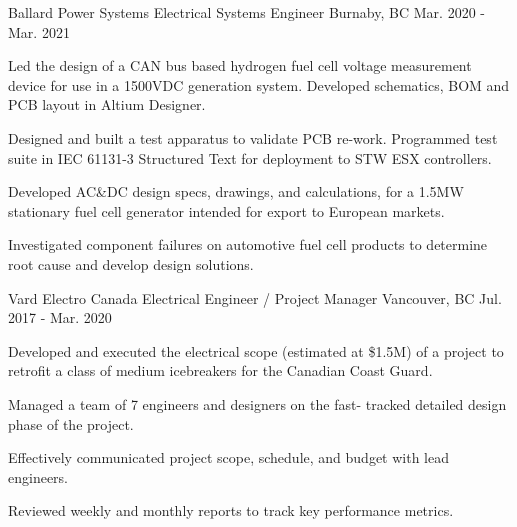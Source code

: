 \begin{cventries}
    \cventry
    {Ballard Power Systems} %
    {Electrical Systems Engineer} %
    {Burnaby, BC} %
    {Mar. 2020 - Mar. 2021} %
    { %
        \begin{cvitems}
            \item {Led the design of a CAN bus based hydrogen fuel cell voltage measurement device for use in a 1500VDC generation system. Developed schematics, BOM and PCB layout in Altium Designer.}
            \item {Designed and built a test apparatus to validate PCB re-work. Programmed test suite in IEC 61131-3 Structured Text for deployment to STW ESX controllers.}
            \item {Developed AC\&DC design specs, drawings, and calculations, for a 1.5MW stationary fuel cell generator intended for export to European markets.}
            \item {Investigated component failures on automotive fuel cell products to determine root cause and develop design solutions.}
        \end{cvitems}
        \vspace{3mm}
        \vspace{1mm}
    }

    \cventry
    {Vard Electro Canada} %
    {Electrical Engineer / Project Manager} %
    {Vancouver, BC} %
    {Jul. 2017 - Mar. 2020} %
    { %
        \begin{cvitems}
            \item {Developed and executed the electrical scope (estimated at \$1.5M) of a project to retrofit a class of medium icebreakers for the Canadian Coast Guard.}
            \item {Managed a team of 7 engineers and designers on the fast- tracked detailed design phase of the project.}
            \item {Effectively communicated project scope, schedule, and budget with lead engineers.}
            \item {Reviewed weekly and monthly reports to track key performance metrics.}
        \end{cvitems}
    }


\end{cventries}
